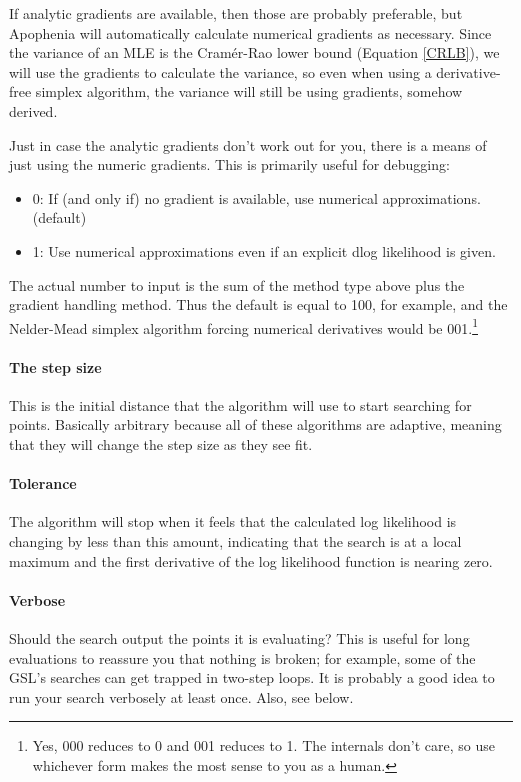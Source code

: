 If analytic gradients are available, then those are probably preferable,
but Apophenia will automatically calculate numerical gradients
as necessary.  Since the variance of an MLE is the Cram\'er-Rao lower
bound (Equation \ref{CRLB}), we will use the gradients to calculate
the variance, so even when using a derivative-free simplex algorithm,
the variance will still be using gradients, somehow derived.

Just in case the analytic gradients don't work out for you, there is a
means of just using the numeric gradients. This is primarily useful for debugging:

\begin{itemize}
\item 0: If (and only if) no gradient is available, use numerical approximations.  (default)
\item 1: Use numerical approximations even if an explicit dlog likelihood is given. 
\end{itemize}

The actual number to input is the sum of the method type above plus the
gradient handling method. Thus the default is equal to 100, for example, and the
Nelder-Mead simplex algorithm forcing numerical derivatives would be
001.\footnote{Yes, 000 reduces to 0 and 001 reduces to 1. The internals
don't care, so use whichever form makes the most sense to you as a human.}


\paragraph{The step size} This is the initial distance that the
algorithm will use to start searching for points. Basically arbitrary
because all of these algorithms are adaptive, meaning that they will
change the step size as they see fit.

\paragraph{Tolerance} The algorithm will stop when it feels
that the calculated log likelihood is changing by less than this amount,
indicating that the search is at a local maximum and the first derivative of
the log likelihood function is nearing zero.

\paragraph{Verbose} Should the search output the points it is evaluating?
This is useful for long evaluations to reassure you that nothing is
broken; for example, some of the GSL's searches can get trapped in two-step loops.
It is probably a good idea to run your search verbosely at least once.
Also, see  below.

